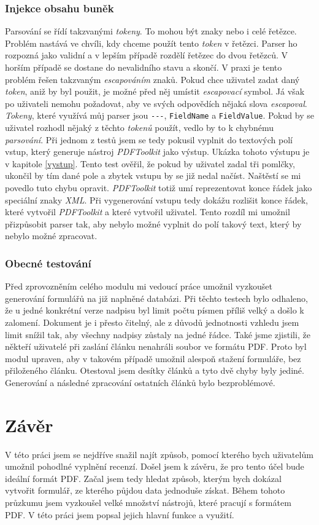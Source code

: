 \documentclass[czech,BP]{thesiskiv}
\begin{document}
\subsection{Injekce obsahu buněk}
Parsování se řídí takzvanými \emph{tokeny}. To mohou být znaky nebo i celé řetězce. Problém nastává ve chvíli, kdy chceme použít tento \emph{token} v řetězci. Parser ho rozpozná jako validní a v lepším případě rozdělí řetězec do dvou řetězců. V horším případě se dostane do nevalidního stavu a skončí. V praxi je tento problém řešen takzvaným \emph{escapováním} znaků. Pokud chce uživatel zadat daný \emph{token}, aniž by byl použit, je možné před něj umístit \emph{escapovací} symbol\cite{Parsovani}.
Já však po uživateli nemohu požadovat, aby ve svých odpovědích nějaká slova \emph{escapoval}. \emph{Tokeny}, které využívá můj parser jsou \texttt{-}\texttt{-}\texttt{-}, \texttt{FieldName} a \texttt{FieldValue}. Pokud by se uživatel rozhodl nějaký z těchto \emph{tokenů} použít, vedlo by to k chybnému \emph{parsování}. Při jednom z testů jsem se tedy pokusil vyplnit do textových polí vstup, který generuje nástroj \emph{PDFToolkit} jako výstup. Ukázka tohoto výstupu je v kapitole \ref{vystup}. Tento test ověřil, že pokud by uživatel zadal tři pomlčky, ukončil by tím dané pole a zbytek vstupu by se již nedal načíst. Naštěstí se mi povedlo tuto chybu opravit. \emph{PDFToolkit} totiž umí reprezentovat konce řádek jako speciální znaky \emph{XML}. Při vygenerování vstupu tedy dokážu rozlišit konce řádek, které vytvořil \emph{PDFToolkit} a které vytvořil uživatel. Tento rozdíl mi umožnil přizpůsobit parser tak, aby nebylo možné vyplnit do polí takový text, který by nebylo možné zpracovat.
\subsection{Obecné testování}
Před zprovozněním celého modulu mi vedoucí práce umožnil vyzkoušet generování formulářů na již naplněné databázi. Při těchto testech bylo odhaleno, že u jedné konkrétní verze nadpisu byl limit počtu písmen příliš velký a došlo k zalomení. Dokument je i přesto čitelný, ale z důvodů jednotnosti vzhledu jsem limit snížil tak, aby všechny nadpisy zůstaly na jedné řádce. Také jsme zjistili, že někteří uživatelé při zaslání článku nenahráli soubor ve formátu PDF. Proto byl modul upraven, aby v takovém případě umožnil alespoň stažení formuláře, bez přiloženého článku. Otestoval jsem desítky článků a tyto dvě chyby byly jediné. Generování a následné zpracování ostatních článků bylo bezproblémové.
\chapter{Závěr}
V této práci jsem se nejdříve snažil najít způsob, pomocí kterého bych uživatelům umožnil pohodlné vyplnění recenzí. Došel jsem k závěru, že pro tento účel bude ideální formát PDF. Začal jsem tedy hledat způsob, kterým bych dokázal vytvořit formulář, ze kterého půjdou data jednoduše získat. Během tohoto průzkumu jsem vyzkoušel velké množství nástrojů, které pracují s formátem PDF. V této práci jsem popsal jejich hlavní funkce a využití. 
\end{document}
